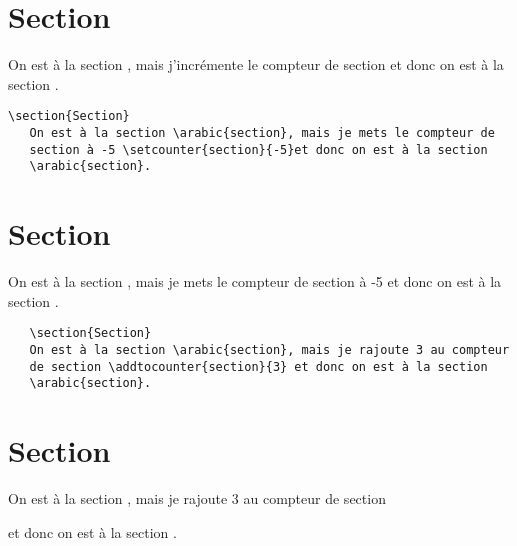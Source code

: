 \documentclass[fontsize=12pt,twoside=false,parskip=half,notitlepage,DIV=17,french]{scrbook}
\begin{document}
\section{Section}
   On est à la section , mais j'incrémente le compteur
   de section et donc on est à la section
   .


\newpage

\setcounter{section}{0}
\setcounter{subsection}{0}


\begin{verbatim}
\section{Section}
   On est à la section \arabic{section}, mais je mets le compteur de
   section à -5 \setcounter{section}{-5}et donc on est à la section
   \arabic{section}.
\end{verbatim}

\section{Section}
   On est à la section , mais je mets le compteur de
   section à -5 \setcounter{section}{-5}et donc on est à la section
   .

\newpage

\setcounter{section}{0}
\setcounter{subsection}{0}


\begin{verbatim}
   \section{Section}
   On est à la section \arabic{section}, mais je rajoute 3 au compteur
   de section \addtocounter{section}{3} et donc on est à la section
   \arabic{section}.
\end{verbatim}


\section{Section}
   On est à la section , mais je rajoute 3 au compteur
   de section \addtocounter{section}{3} et donc on est à la section
   .


\newpage

   \setcounter{section}{0}
   \setcounter{subsection}{0}
\end{document}
